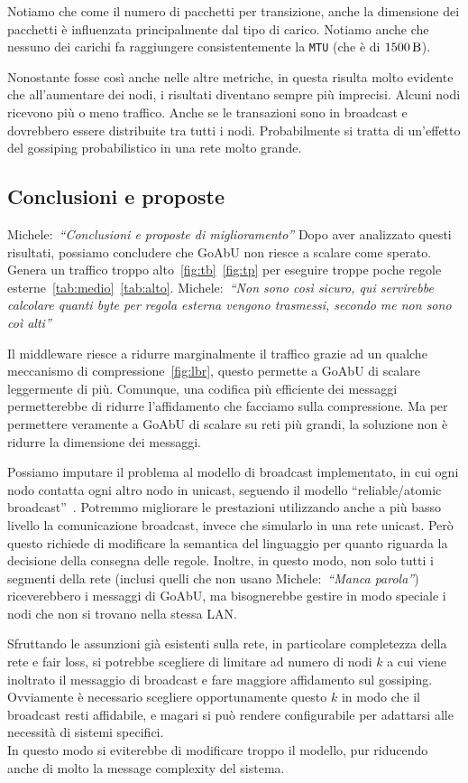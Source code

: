 \documentclass[12pt, a4paper]{article}
\newcommand{\michele}[1]{{\color{red}Michele:~}{\itshape``{#1}''}}
\begin{document}
Notiamo che come il numero di pacchetti per transizione, anche la dimensione dei pacchetti è influenzata principalmente dal tipo di carico.
Notiamo anche che nessuno dei carichi fa raggiungere consistentemente la \lstinline{MTU} (che è di $\qty{1500}{\byte}$).

Nonostante fosse così anche nelle altre metriche, in questa risulta molto evidente che all'aumentare dei nodi, i risultati diventano sempre più imprecisi.
Alcuni nodi ricevono più o meno traffico. Anche se le transazioni sono in broadcast e dovrebbero essere distribuite tra tutti i nodi.
Probabilmente si tratta di un'effetto del gossiping probabilistico in una rete molto grande.

\subsection{Conclusioni e proposte}
\michele{Conclusioni e proposte di miglioramento}
Dopo aver analizzato questi risultati, possiamo concludere che GoAbU non riesce a scalare come sperato. Genera un traffico troppo alto~\ref{fig:tb}~\ref{fig:tp} per eseguire troppe poche regole esterne~\ref{tab:medio}~\ref{tab:alto}. \michele{Non sono così sicuro, qui servirebbe calcolare quanti byte per regola esterna vengono trasmessi, secondo me non sono coì alti}

Il middleware riesce a ridurre marginalmente il traffico grazie ad un qualche meccanismo di compressione~\ref{fig:lbr}, questo permette a GoAbU di scalare leggermente di più. Comunque, una codifica più efficiente dei messaggi permetterebbe di ridurre l'affidamento che facciamo sulla compressione. Ma per permettere veramente a GoAbU di scalare su reti più grandi, la soluzione non è ridurre la dimensione dei messaggi.

Possiamo imputare il problema al modello di broadcast implementato, in cui ogni nodo contatta ogni altro nodo in unicast, seguendo il modello ``reliable/atomic broadcast''~\cite{joseph1989reliable}.
Potremmo migliorare le prestazioni utilizzando anche a più basso livello la comunicazione broadcast, invece che simularlo in una rete unicast. Però questo richiede di modificare la semantica del linguaggio per quanto riguarda la decisione della consegna delle regole.
Inoltre, in questo modo, non solo tutti i segmenti della rete (inclusi quelli che non usano \michele{Manca parola}) riceverebbero i messaggi di GoAbU, ma bisognerebbe gestire in modo speciale i nodi che non si trovano nella stessa LAN.

Sfruttando le assunzioni già esistenti sulla rete, in particolare completezza della rete e fair loss, si potrebbe scegliere di limitare ad numero di nodi $k$ a cui viene inoltrato il messaggio di broadcast e fare maggiore affidamento sul gossiping.
Ovviamente è necessario scegliere opportunamente questo $k$ in modo che il broadcast resti affidabile, e magari si può rendere configurabile per adattarsi alle necessità di sistemi specifici.\\
In questo modo si eviterebbe di modificare troppo il modello, pur riducendo anche di molto la message complexity del sistema.
\end{document}
